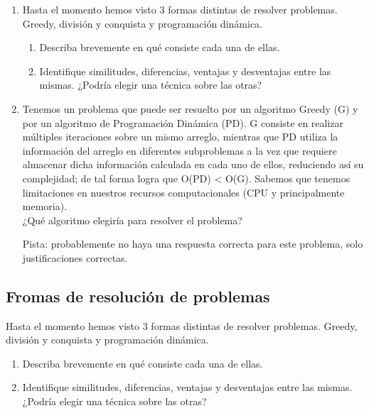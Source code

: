 \documentclass[titlepage,a4paper]{article}
\begin{document}
\begin{enumerate}
\item Hasta el momento hemos visto 3 formas distintas de resolver problemas.
    Greedy, división y conquista y programación dinámica. \begin{enumerate}
        \item Describa brevemente en qué consiste cada una de ellas.
        \item Identifique similitudes, diferencias, ventajas y
        desventajas entre las mismas. ¿Podría elegir una técnica sobre las otras?
    \end{enumerate}
\item Tenemos un problema que puede ser resuelto por un algoritmo Greedy (G) y
    por un algoritmo de Programación Dinámica (PD). G consiste en realizar múltiples
    iteraciones sobre un mismo arreglo, mientras que PD utiliza la información del
    arreglo en diferentes subproblemas a la vez que requiere almacenar dicha
    información calculada en cada uno de ellos, reduciendo así su complejidad;
    de tal forma logra que O(PD) < O(G). Sabemos que tenemos limitaciones en nuestros
    recursos computacionales (CPU y principalmente memoria).\\
    ¿Qué algoritmo elegiría para resolver el problema?\par
    Pista: probablemente no haya una respuesta correcta para este problema, solo justificaciones correctas.
\end{enumerate}

\setcounter{subsection}{0}%
\renewcommand{\thesubsection}{\arabic{subsection}}%

\newpage\subsection{Fromas de resolución de problemas}\label{sec:parte2_1}
\begin{tcolorbox}[colback=blue!5!white,colframe=blue!75!black,title=Enunciado 2.1]
    Hasta el momento hemos visto 3 formas distintas de resolver problemas.
    Greedy, división y conquista y programación dinámica. \begin{enumerate}
        \item Describa brevemente en qué consiste cada una de ellas.
        \item Identifique similitudes, diferencias, ventajas y
        desventajas entre las mismas. ¿Podría elegir una técnica sobre las otras?
    \end{enumerate}
\end{tcolorbox}
\end{document}
